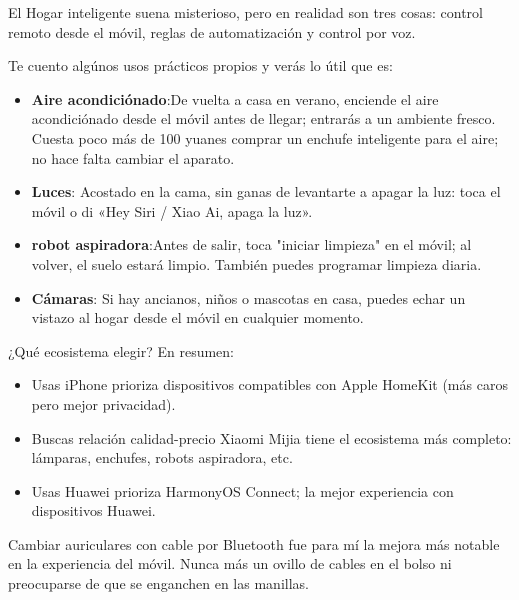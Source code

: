 
El Hogar inteligente suena misterioso, pero en realidad son tres cosas: control remoto desde el móvil, reglas de automatización y control por voz.

Te cuento algúnos usos prácticos propios y verás lo útil que es:

\begin{itemize}
  \item \textbf{Aire acondiciónado}:De vuelta a casa en verano, enciende el aire acondiciónado desde el móvil antes de llegar; entrarás a un ambiente fresco. Cuesta poco más de 100 yuanes comprar un enchufe inteligente para el aire; no hace falta cambiar el aparato.
  \item \textbf{Luces}: Acostado en la cama, sin ganas de levantarte a apagar la luz: toca el móvil o di «Hey Siri / Xiao Ai, apaga la luz».
  \item \textbf{robot aspiradora}:Antes de salir, toca "iniciar limpieza" en el móvil; al volver, el suelo estará limpio. También puedes programar limpieza diaria.
  \item \textbf{Cámaras}: Si hay ancianos, niños o mascotas en casa, puedes echar un vistazo al hogar desde el móvil en cualquier momento.
\end{itemize}

¿Qué ecosistema elegir? En resumen:

\begin{itemize}
  \item Usas iPhone prioriza dispositivos compatibles con Apple HomeKit (más caros pero mejor privacidad).
  \item Buscas relación calidad-precio Xiaomi Mijia tiene el ecosistema más completo: lámparas, enchufes, robots aspiradora, etc.
  \item Usas Huawei prioriza HarmonyOS Connect; la mejor experiencia con dispositivos Huawei.
\end{itemize}


Cambiar auriculares con cable por Bluetooth fue para mí la mejora más notable en la experiencia del móvil. Nunca más un ovillo de cables en el bolso ni preocuparse de que se enganchen en las manillas.

